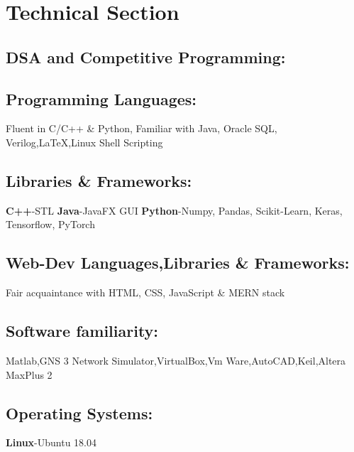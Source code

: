 \documentclass{article}
\begin{document}

\section*{Technical Section}

\subsection*{DSA and Competitive Programming:}

\subsection*{Programming Languages:}
Fluent in C/C++ \& Python, Familiar with Java, Oracle SQL, Verilog,{\LaTeX},Linux Shell Scripting

\subsection*{Libraries \& Frameworks:}
\textbf{C++}-STL
\textbf{Java}-JavaFX GUI
\textbf{Python}-Numpy, Pandas, Scikit-Learn, Keras, Tensorflow, PyTorch
\subsection*{Web-Dev Languages,Libraries \& Frameworks:}
Fair acquaintance with HTML, CSS, JavaScript \& MERN stack

\subsection*{Software familiarity:}
Matlab,GNS 3 Network Simulator,VirtualBox,Vm Ware,AutoCAD,Keil,Altera MaxPlus 2

\subsection*{Operating Systems:}
\textbf{ Linux}-Ubuntu 18.04
\end{document}
